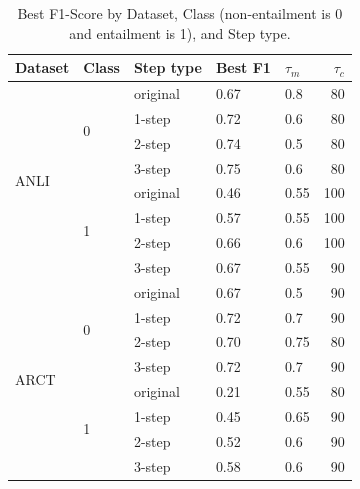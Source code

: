 \begin{table}[t]
  \centering
  \begin{tabular}{lllllr}
    \toprule
    Dataset & Class & Step type & Best F1 & $\tau_m$ & $\tau_c$ \\
    \midrule
    \multirow{8}{*}{ANLI}
    & \multirow{4}{*}{0} & original & 0.67 & 0.8 & 80 \\
    & & 1-step & 0.72 & 0.6 & 80 \\
    & & 2-step & 0.74 & 0.5 & 80 \\
    & & 3-step & 0.75 & 0.6 & 80 \\
    \cmidrule(l){2-6}
    & \multirow{4}{*}{1} & original & 0.46 & 0.55 & 100 \\
    & & 1-step & 0.57 & 0.55 & 100 \\
    & & 2-step & 0.66 & 0.6 & 100 \\
    & & 3-step & 0.67 & 0.55 & 90 \\
    \midrule
    \multirow{8}{*}{ARCT}
    & \multirow{4}{*}{0} & original & 0.67 & 0.5 & 90 \\
    & & 1-step & 0.72 & 0.7 & 90 \\
    & & 2-step & 0.70 & 0.75 & 80 \\
    & & 3-step & 0.72 & 0.7 & 90 \\
    \cmidrule(l){2-6}
    & \multirow{4}{*}{1} & original & 0.21 & 0.55 & 80 \\
    & & 1-step & 0.45 & 0.65 & 90 \\
    & & 2-step & 0.52 & 0.6 & 90 \\
    & & 3-step & 0.58 & 0.6 & 90 \\
    \bottomrule
  \end{tabular}
  \caption{Best F1-Score by Dataset, Class (non-entailment is 0 and entailment is 1), and Step type.}
  \label{tab:best_f1_scores}
\end{table}
